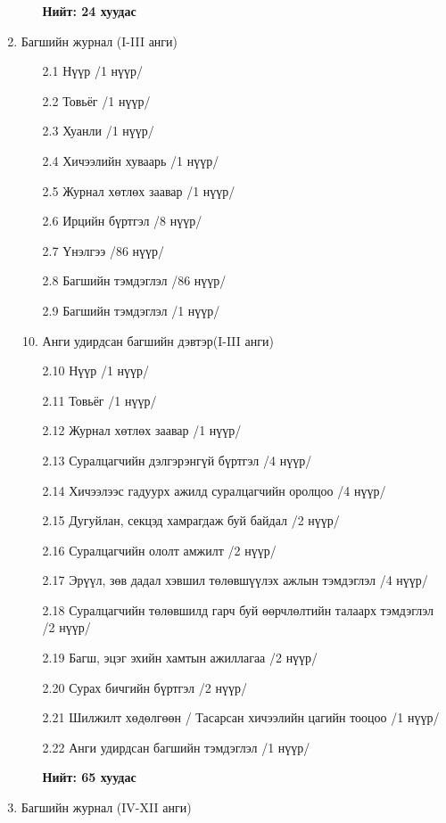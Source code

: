 \begin{enumerate}
\begin{enumerate}
\begin{flushright}
			{\large \textbf{ Нийт: 24 хуудас}}
		\end{flushright}
	\end{enumerate}
	\item Багшийн журнал (I-III анги)
	\begin{enumerate}
		\item[2.1] Нүүр /1 нүүр/
		\item[2.2] Товьёг /1 нүүр/
		\item[2.3] Хуанли /1 нүүр/
		\item[2.4] Хичээлийн хуваарь /1 нүүр/
		\item[2.5] Журнал хөтлөх заавар /1 нүүр/
		\item[2.6] Ирцийн бүртгэл /8 нүүр/
		\item[2.7] Үнэлгээ /86 нүүр/
		\item[2.8] Багшийн тэмдэглэл /86 нүүр/
		\item[2.9] Багшийн тэмдэглэл /1 нүүр/
		\item Анги удирдсан багшийн дэвтэр(I-III анги)
		\item[2.10] Нүүр /1 нүүр/
		\item[2.11] Товьёг /1 нүүр/
		\item[2.12] Журнал хөтлөх заавар /1 нүүр/
		\item[2.13] Суралцагчийн дэлгэрэнгүй бүртгэл /4 нүүр/
		\item[2.14] Хичээлээс гадуурх ажилд суралцагчийн оролцоо /4 нүүр/
		\item[2.15] Дугуйлан, секцэд хамрагдаж буй байдал /2 нүүр/
		\item[2.16] Суралцагчийн ололт амжилт /2 нүүр/
		\item[2.17] Эрүүл, зөв дадал хэвшил төлөвшүүлэх ажлын тэмдэглэл /4 нүүр/
		\item[2.18] Суралцагчийн төлөвшилд гарч буй өөрчлөлтийн талаарх тэмдэглэл /2 нүүр/
		\item[2.19] Багш, эцэг эхийн хамтын ажиллагаа /2 нүүр/
		\item[2.20] Сурах бичгийн бүртгэл /2 нүүр/
		\item[2.21] Шилжилт хөдөлгөөн / Тасарсан хичээлийн цагийн тооцоо /1 нүүр/
		\item[2.22] Анги удирдсан багшийн тэмдэглэл /1 нүүр/\\ 
		\begin{flushright}
			{\large \textbf{ Нийт: 65 хуудас}}
		\end{flushright}
	\end{enumerate}
	\item Багшийн журнал (IV-XII анги)

\end{enumerate}
